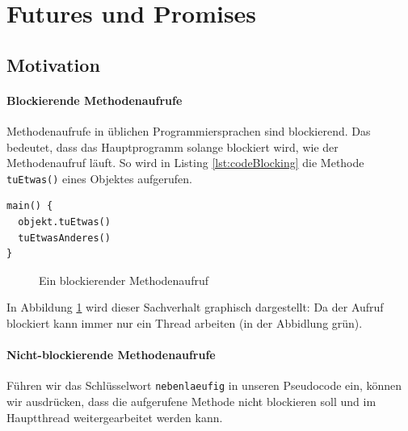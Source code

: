 \section{Futures und Promises}

\subsection{Motivation}

\paragraph{Blockierende Methodenaufrufe} Methodenaufrufe in üblichen Programmiersprachen sind blockierend. Das bedeutet,
dass das Hauptprogramm solange blockiert wird, wie der Methodenaufruf läuft.
So wird in Listing \ref{lst:codeBlocking} die Methode \texttt{tuEtwas()} eines Objektes aufgerufen.

\begin{lstlisting}[caption={Blockierender Methodenaufruf},label={lst:codeBlocking},captionpos=b]
main() {
  objekt.tuEtwas()
  tuEtwasAnderes()
}
\end{lstlisting}

\begin{figure}[htbp]
  \centering
  \caption{Ein blockierender Methodenaufruf }
  \label{blockingCall}
\end{figure}

In Abbildung \ref{blockingCall} wird dieser Sachverhalt graphisch
dargestellt: Da der Aufruf blockiert kann immer nur ein Thread
arbeiten (in der Abbidlung grün).

\paragraph{Nicht-blockierende Methodenaufrufe} Führen wir das Schlüsselwort
\texttt{nebenlaeufig} in unseren Pseudocode ein,
können wir ausdrücken, dass die aufgerufene Methode nicht blockieren soll
und im Hauptthread weitergearbeitet werden kann.

